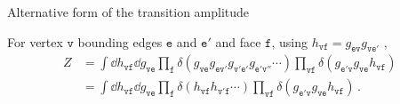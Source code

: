\documentclass[12pt,titlepage]{article}
\begin{document}
\begin{frame}{Alternative form of the transition amplitude}
\begin{list}{\,}{\leftmargin=1em \itemindent=0em}
\begin{figure}[!ht]
\begin{minipage}{0.75\linewidth}
            \end{minipage}
        \end{figure}\FloatBarrier
        \item<3-> For vertex $\mathtt{v}$ bounding edges $\mathtt{e}$ and $\mathtt{e'}$ and face $\mathtt{f}$, using $h_\mathtt{vf}=g_{\mathtt{ev}}g_{\mathtt{ve'}}$ ,
        \begin{align}
            Z&=\int\dd{h_\mathtt{vf}}\dd{g_\mathtt{ve}}\prod_\mathtt{f}\delta(g_\mathtt{ve}g_\mathtt{ev'}g_\mathtt{v'e'}g_\mathtt{e'v''}\cdots)\prod_\mathtt{vf}\delta(g_\mathtt{e'v}g_\mathtt{ve}h_\mathtt{vf})\,\\
            &=\int\dd{h_\mathtt{vf}}\dd{g_\mathtt{ve}}\prod_\mathtt{f}\delta(h_\mathtt{vf}h_\mathtt{v'f}\cdots)\prod_\mathtt{vf}\delta(g_\mathtt{e'v}g_\mathtt{ve}h_\mathtt{vf})\,.
        \end{align}
    \end{list}
\end{frame}
\end{document}
